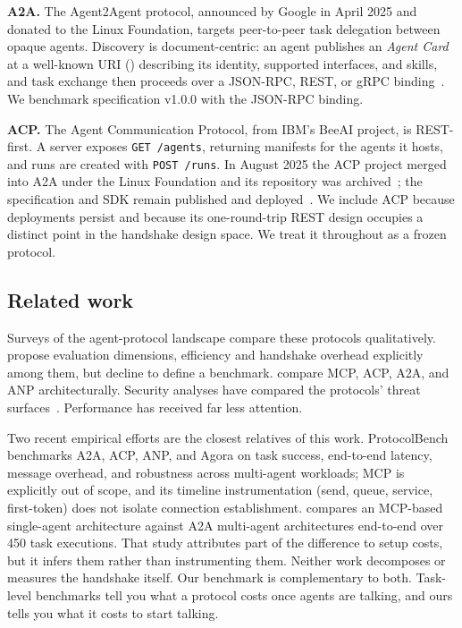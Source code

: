 \documentclass[10pt]{article}
\newcommand{\pth}[1]{\path{#1}}
\begin{document}
\textbf{A2A.} The Agent2Agent protocol, announced by Google in April 2025
and donated to the Linux Foundation, targets peer-to-peer task delegation
between opaque agents. Discovery is document-centric: an agent publishes
an \emph{Agent Card} at a well-known URI
(\pth{/.well-known/agent-card.json}) describing its identity,
supported interfaces, and skills, and task exchange then proceeds over a
JSON-RPC, REST, or gRPC binding~\citep{a2aspec2026}. We benchmark
specification v1.0.0 with the JSON-RPC binding.

\textbf{ACP.} The Agent Communication Protocol, from IBM's BeeAI project,
is REST-first. A server exposes \texttt{GET /agents}, returning manifests
for the agents it hosts, and runs are created with \texttt{POST /runs}.
In August 2025 the ACP project merged into A2A under the Linux Foundation
and its repository was archived~\citep{lfaidata2025acp}; the
specification and SDK remain published and deployed~\citep{acpspec2025}.
We include ACP because deployments persist and because its one-round-trip
REST design occupies a distinct point in the handshake design space. We
treat it throughout as a frozen protocol.

\subsection{Related work}

Surveys of the agent-protocol landscape compare these protocols
qualitatively. \citet{yang2025survey} propose evaluation dimensions,
efficiency and handshake overhead explicitly among them, but decline to
define a benchmark. \citet{ehtesham2025survey} compare MCP, ACP, A2A, and
ANP architecturally. Security analyses have compared the protocols'
threat surfaces~\citep{louck2025security,anbiaee2026threat,hou2025mcp}.
Performance has received far less attention.

Two recent empirical efforts are the closest relatives of this work.
ProtocolBench~\citep{du2026protocolbench} benchmarks A2A, ACP, ANP, and
Agora on task success, end-to-end latency, message overhead, and
robustness across multi-agent workloads; MCP is explicitly out of scope,
and its timeline instrumentation (send, queue, service, first-token) does
not isolate connection establishment. \citet{dobrovolskyi2026empirical}
compares an MCP-based single-agent architecture against A2A multi-agent
architectures end-to-end over 450 task executions. That study attributes
part of the difference to setup costs, but it infers them rather than
instrumenting them. Neither work decomposes or measures the handshake
itself. Our benchmark is
complementary to both. Task-level benchmarks tell you what a protocol
costs once agents are talking, and ours tells you what it costs to start
talking.
\end{document}
